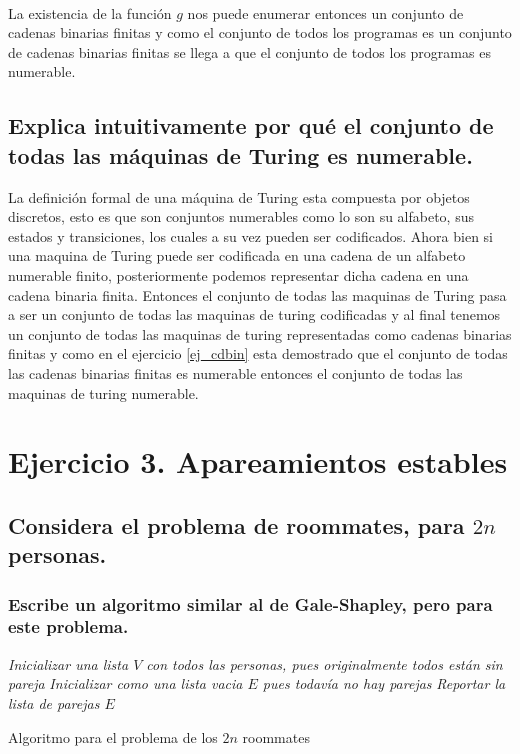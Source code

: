 \documentclass[12pt]{article}
\begin{document}
\paragraph{}
La existencia de la función $g$ nos puede enumerar entonces un conjunto de cadenas binarias finitas y como el conjunto de todos los programas es un conjunto de cadenas binarias finitas se llega a que el conjunto de todos los programas es numerable.
\pagebreak
\subsection{Explica intuitivamente por qué el conjunto de todas las máquinas de Turing es numerable.}
La definición formal de una máquina de Turing esta compuesta por objetos discretos, esto es que son conjuntos numerables como lo son su alfabeto, sus estados y transiciones, los cuales a su vez pueden ser codificados. Ahora bien si una maquina de Turing puede ser codificada en una cadena de un alfabeto numerable finito, posteriormente podemos representar dicha cadena en una cadena binaria finita. Entonces el conjunto de todas las maquinas de Turing pasa a ser un conjunto de todas las maquinas de turing codificadas y al final tenemos un conjunto de todas las maquinas de turing representadas como cadenas binarias finitas y como en el ejercicio \ref{ej_cdbin} esta demostrado que el conjunto de todas las cadenas binarias finitas es numerable entonces el conjunto de todas las maquinas de turing numerable.
\section{Ejercicio 3. Apareamientos estables}
\subsection{Considera el problema de roommates, para $2n$ personas.}
\subsubsection{Escribe un algoritmo similar al de Gale-Shapley, pero para este problema.}
\begin{algorithm}[H]
	\SetAlgoLined
	\emph{Inicializar una lista $V$ con todos las personas, pues originalmente todos están sin pareja}\;
		\emph{Inicializar como una lista vacia $E$ pues todavía no hay parejas}\;
	\emph{Reportar la lista de parejas $E$}\;
	\caption{Algoritmo para el problema de los $2n$ roommates}
\end{algorithm}
\end{document}
